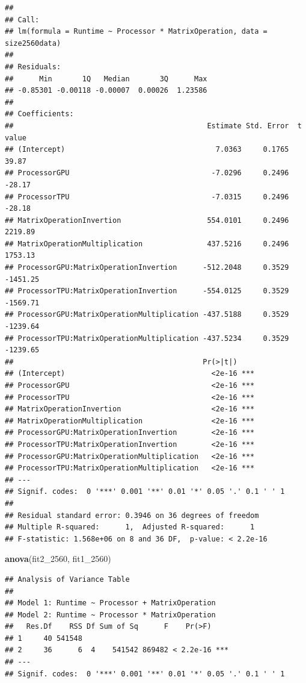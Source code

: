 \documentclass[
]{article}
\newenvironment{Shaded}{\begin{snugshade}}{\end{snugshade}}
\newcommand{\DecValTok}[1]{\textcolor[rgb]{0.00,0.00,0.81}{#1}}
\newcommand{\KeywordTok}[1]{\textcolor[rgb]{0.13,0.29,0.53}{\textbf{#1}}}
\newcommand{\NormalTok}[1]{#1}
\begin{document}
\begin{verbatim}
## 
## Call:
## lm(formula = Runtime ~ Processor * MatrixOperation, data = size2560data)
## 
## Residuals:
##      Min       1Q   Median       3Q      Max 
## -0.85301 -0.00118 -0.00007  0.00026  1.23586 
## 
## Coefficients:
##                                             Estimate Std. Error  t value
## (Intercept)                                   7.0363     0.1765    39.87
## ProcessorGPU                                 -7.0296     0.2496   -28.17
## ProcessorTPU                                 -7.0315     0.2496   -28.18
## MatrixOperationInvertion                    554.0101     0.2496  2219.89
## MatrixOperationMultiplication               437.5216     0.2496  1753.13
## ProcessorGPU:MatrixOperationInvertion      -512.2048     0.3529 -1451.25
## ProcessorTPU:MatrixOperationInvertion      -554.0125     0.3529 -1569.71
## ProcessorGPU:MatrixOperationMultiplication -437.5188     0.3529 -1239.64
## ProcessorTPU:MatrixOperationMultiplication -437.5234     0.3529 -1239.65
##                                            Pr(>|t|)    
## (Intercept)                                  <2e-16 ***
## ProcessorGPU                                 <2e-16 ***
## ProcessorTPU                                 <2e-16 ***
## MatrixOperationInvertion                     <2e-16 ***
## MatrixOperationMultiplication                <2e-16 ***
## ProcessorGPU:MatrixOperationInvertion        <2e-16 ***
## ProcessorTPU:MatrixOperationInvertion        <2e-16 ***
## ProcessorGPU:MatrixOperationMultiplication   <2e-16 ***
## ProcessorTPU:MatrixOperationMultiplication   <2e-16 ***
## ---
## Signif. codes:  0 '***' 0.001 '**' 0.01 '*' 0.05 '.' 0.1 ' ' 1
## 
## Residual standard error: 0.3946 on 36 degrees of freedom
## Multiple R-squared:      1,  Adjusted R-squared:      1 
## F-statistic: 1.568e+06 on 8 and 36 DF,  p-value: < 2.2e-16
\end{verbatim}

\begin{Shaded}
\begin{Highlighting}[]
\KeywordTok{anova}\NormalTok{(fit2\_}\DecValTok{2560}\NormalTok{, fit1\_}\DecValTok{2560}\NormalTok{)}
\end{Highlighting}
\end{Shaded}

\begin{verbatim}
## Analysis of Variance Table
## 
## Model 1: Runtime ~ Processor + MatrixOperation
## Model 2: Runtime ~ Processor * MatrixOperation
##   Res.Df    RSS Df Sum of Sq      F    Pr(>F)    
## 1     40 541548                                  
## 2     36      6  4    541542 869482 < 2.2e-16 ***
## ---
## Signif. codes:  0 '***' 0.001 '**' 0.01 '*' 0.05 '.' 0.1 ' ' 1
\end{verbatim}
\end{document}
